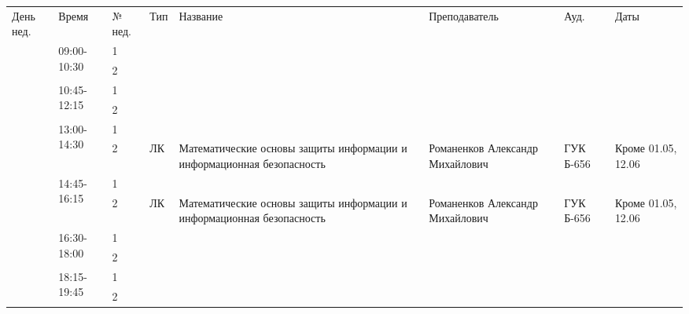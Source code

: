 \begin{tabular}{|p{1cm}|p{2.1cm}|p{0.7cm}|p{1cm}|p{9cm}|p{4cm}|p{2.5cm}|p{2.5cm}|}
\hline
День нед. & Время & № нед. & Тип & Название & Преподаватель & Ауд. & Даты \\
\hhline{|=|=|=|=|=|=|=|=|}
\multirow{12}{*}{Сб} & \multirow{2}{*}{09:00-10:30} & 1 &  &  &  &  & \\
\cline{3-8} & & 2 &  &  &  &  & \\
\cline{2-8} & \multirow{2}{*}{10:45-12:15} & 1 &  &  &  &  & \\
\cline{3-8} & & 2 &  &  &  &  & \\
\cline{2-8} & \multirow{2}{*}{13:00-14:30} & 1 &  &  &  &  & \\
\cline{3-8} & & 2 & ЛК  & Математические основы защиты информации и информационная безопасность & Романенков Александр Михайлович & ГУК Б-656 & Кроме 01.05, 12.06\\
\cline{2-8} & \multirow{2}{*}{14:45-16:15} & 1 &  &  &  &  & \\
\cline{3-8} & & 2 & ЛК  & Математические основы защиты информации и информационная безопасность & Романенков Александр Михайлович & ГУК Б-656 & Кроме 01.05, 12.06\\
\cline{2-8} & \multirow{2}{*}{16:30-18:00} & 1 &  &  &  &  & \\
\cline{3-8} & & 2 &  &  &  &  & \\
\cline{2-8} & \multirow{2}{*}{18:15-19:45} & 1 &  &  &  &  & \\
\cline{3-8} & & 2 &  &  &  &  & \\
\hline
\end{tabular}
\newpage

